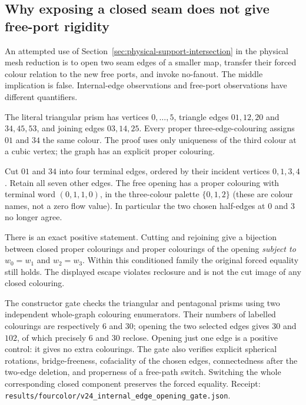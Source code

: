 \subsection{Why exposing a closed seam does not give free-port rigidity}
\label{sec:internal-edge-opening}

An attempted use of Section~\ref{sec:physical-support-intersection} in
the physical mesh reduction is to open two seam edges of a smaller map,
transfer their forced colour relation to the new free ports, and invoke
no-fanout. The middle implication is false. Internal-edge observations
and free-port observations have different quantifiers.

The literal triangular prism has vertices $0,\ldots,5$, triangle edges
$01,12,20$ and $34,45,53$, and joining edges $03,14,25$.
Every proper three-edge-colouring assigns $01$ and $34$ the same colour.
The proof uses only uniqueness of the third colour at a cubic vertex;
the graph has an explicit proper colouring.

Cut $01$ and $34$ into four terminal edges, ordered by their incident
vertices $0,1,3,4$. Retain all seven other edges. The free opening has a
proper colouring with terminal word $(0,1,1,0)$, in the three-colour
palette $\{0,1,2\}$ (these are colour names, not a zero flow value).
In particular the two chosen half-edges at $0$ and $3$ no longer agree.

There is an exact positive statement. Cutting and rejoining give a
bijection between closed proper colourings and proper colourings of the
opening \emph{subject to} $w_0=w_1$ and $w_2=w_3$. Within this conditioned
family the original forced equality still holds. The displayed escape
violates reclosure and is not the cut image of any closed colouring.

The constructor gate checks the triangular and pentagonal prisms using
two independent whole-graph colouring enumerators. Their numbers of
labelled colourings are respectively $6$ and $30$; opening the two
selected edges gives $30$ and $102$, of which precisely $6$ and $30$
reclose. Opening just one edge is a positive control: it gives no extra
colourings. The gate also verifies explicit spherical rotations,
bridge-freeness, cofaciality of the chosen edges, connectedness after the
two-edge deletion, and properness of a free-path switch. Switching the
whole corresponding closed component preserves the forced equality.
Receipt: \texttt{results/fourcolor/v24\_internal\_edge\_opening\_gate.json}.

